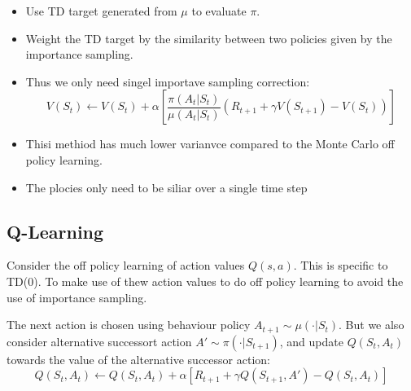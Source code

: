 \begin{itemize}
  \item Use TD target generated from \(\mu\) to evaluate \(\pi\).
  \item Weight the TD target by the similarity between two policies given by the importance
  sampling.
  \item Thus we only need singel importave sampling correction:
  \[
    V(S_t) \leftarrow V(S_t) + \alpha \left[
    \frac{\pi(A_t|S_t)}{\mu(A_t|S_t)} \left( 
      R_{t+1} + \gamma V(S_{t+1}) - V(S_t)
    \right) 
    \right]
  \]
\item Thisi methiod has much lower varianvce compared to the Monte Carlo off policy learning.
\item The plocies only need to be siliar over a single time step
\end{itemize}

\subsection{Q-Learning}
Consider the off policy learning of action values \(Q(s,a)\). This is specific to TD(0).
To make use of thew action values to do off policy learning to avoid the use of importance
sampling.

The next action is chosen using behaviour policy \(A_{t+1} \sim \mu(\cdot|S_{t})\). 
But we also consider alternative successort action \(A' \sim \pi(\cdot|S_{t+1})\),
and update \(Q(S_t,A_t)\) towards the value of the alternative successor action:
\[
    Q(S_t, A_t) \leftarrow Q(S_t, A_t) + \alpha \left[ 
      R_{t+1} + \gamma Q(S_{t+1}, A') - Q(S_t, A_t)
    \right]
\]


